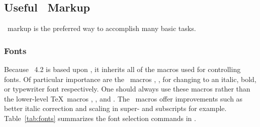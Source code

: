 \documentclass[%
,aps%
 ,twocolumn%
 ,secnumarabic%
,amssymb, amsmath,nobibnotes, aps, prl, floatfix]{revtex4-2}
\begin{document}
\subsection{Useful \LaTeXe\ Markup}
\LaTeXe\ markup is the preferred way to accomplish many basic tasks.

\subsubsection{Fonts}

Because \revtex~4.2 is based upon \LaTeXe, it inherits all of the
macros used for controlling fonts. Of particular importance are the
\LaTeXe\ macros \cmd{\textit}, \cmd{\textbf}, \cmd{\texttt} for changing to
an italic, bold, or typewriter font respectively. One should always
use these macros rather than the lower-level \TeX\ macros \cmd{\it},
\cmd{\bf}, and \cmd{\tt}. The \LaTeXe\ macros offer
improvements such as better italic correction and scaling in super-
and subscripts for example. Table~\ref{tab:fonts}
summarizes the font selection commands in \LaTeXe.
\end{document}
